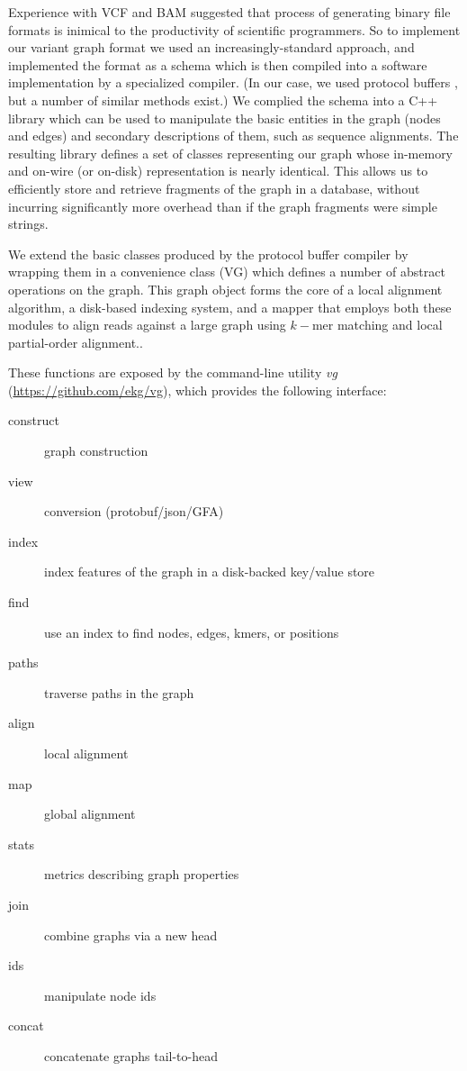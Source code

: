 \documentclass{article}
\begin{document}
Experience with VCF \cite{danecek2011} and BAM \cite{li2009sambam} suggested that process of generating binary file formats is inimical to the productivity of scientific programmers.
So to implement our variant graph format we used an increasingly-standard approach, and implemented the format as a schema which is then compiled into a software implementation by a specialized compiler. (In our case, we used protocol buffers \cite{protobuf}, but a number of similar methods exist.)
We complied the schema into a C++ library which can be used to manipulate the basic entities in the graph (nodes and edges) and secondary descriptions of them, such as sequence alignments.
The resulting library defines a set of classes representing our graph whose in-memory and on-wire (or on-disk) representation is nearly identical.
This allows us to efficiently store and retrieve fragments of the graph in a database, without incurring significantly more overhead than if the graph fragments were simple strings.

We extend the basic classes produced by the protocol buffer compiler by wrapping them in a convenience class (VG) which defines a number of abstract operations on the graph. This graph object forms the core of a local alignment algorithm, a disk-based indexing system, and a mapper that employs both these modules to align reads against a large graph using $k-$mer matching and local partial-order alignment..

These functions are exposed by the command-line utility \emph{vg} (\url{https://github.com/ekg/vg}), which provides the following interface:

\begin{description}
  \item[ construct    ] graph construction
  \item[ view         ] conversion (protobuf/json/GFA)
  \item[ index        ] index features of the graph in a disk-backed key/value store
  \item[ find         ] use an index to find nodes, edges, kmers, or positions
  \item[ paths        ] traverse paths in the graph
  \item[ align        ] local alignment
  \item[ map          ] global alignment
  \item[ stats        ] metrics describing graph properties
  \item[ join         ] combine graphs via a new head
  \item[ ids          ] manipulate node ids
  \item[ concat       ] concatenate graphs tail-to-head
\end{description}
\end{document}
